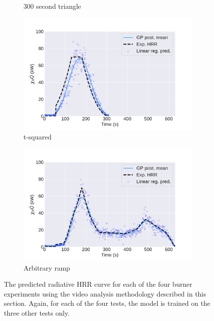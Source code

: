 \documentclass{article}
\begin{document}
\begin{figure}[htbp]
\begin{subfigure}[t]{.45\textwidth}
      \caption{300 second triangle}
      \label{fig:image_result_300s_triangle}
  \end{subfigure}
   \begin{subfigure}[t]{.45\textwidth}
      \centering
      \includegraphics[width=\textwidth ,keepaspectratio]{figures/image_resultt_squared.pdf}
      \caption{t-squared}
      \label{fig:image_result_t_squared}
  \end{subfigure}
    \begin{subfigure}[t]{.45\textwidth}
      \centering
      \includegraphics[width=\textwidth ,keepaspectratio]{figures/image_resultweird_curve.pdf}
      \caption{Arbitrary ramp}
      \label{fig:image_result_weird_curve}
  \end{subfigure}
  \caption{The predicted radiative HRR curve for each of the four burner experiments using the video analysis methodology described in this section. Again, for each of the four tests, the model is trained on the three other tests only.} 
  \label{fig:image_results}
\end{figure}
\end{document}
